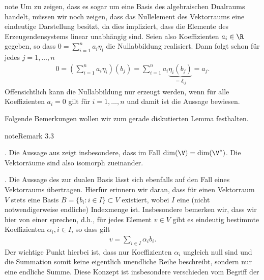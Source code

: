 \documentclass[letterpaper,10pt,english]{jupyterBook}
\begin{document}
\begin{sphinxadmonition}{note}
\sphinxAtStartPar
Um zu zeigen, dass es sogar um eine Basis des algebraischen Dualraums handelt, müssen wir noch zeigen, dass das Nullelement des Vektorraums eine eindeutige Darstellung besitzt, da dies impliziert, dass die Elemente des Erzeugendensystems linear unabhängig sind.
Seien also Koeffizienten \(a_i\in\R\) gegeben, so dass \(0 = \sum_{i=1}^n a_i \eta_i\) die Nullabbildung realisiert.
Dann folgt schon für jedes \(j=1,\ldots,n\)
\begin{equation*}
\begin{split}0 = \left(\sum_{i=1}^n a_i \eta_i\right)(b_j) = \sum_{i=1}^n a_i \underbrace{\eta_i(b_j)}_{=\delta_{ij}} = a_j.\end{split}
\end{equation*}
\sphinxAtStartPar
Offensichtlich kann die Nullabbildung nur erzeugt werden, wenn für alle Koeffizienten \(a_i=0\) gilt für \(i=1,\ldots,n\) und damit ist die Aussage bewiesen.
\end{sphinxadmonition}

\sphinxAtStartPar
Folgende Bemerkungen wollen wir zum gerade diskutierten Lemma festhalten.
\label{vektoranalysis/multilinear:remark-11}
\begin{sphinxadmonition}{note}{Remark 3.3}



. Die Aussage aus {\hyperref[\detokenize{vektoranalysis/multilinear:lem:dualeBasis}]{}} zeigt insbesondere, dass im  Fall \(\dim(\V) = \dim(\V^\ast)\).
Die Vektorräume sind also isomorph zueinander.

. Die Aussage des {\hyperref[\detokenize{vektoranalysis/multilinear:lem:dualeBasis}]{}} zur dualen Basis lässt sich ebenfalls auf den Fall eines  Vektorraums übertragen.
Hierfür erinnern wir daran, dass für einen Vektorraum \(V\) stets eine Basis \(B = \{b_i:i\in I\}\subset V\) existiert, wobei \(I\) eine (nicht notwendigerweise endliche) Indexmenge ist.
Insbesondere bemerken wir, dass wir hier von einer  sprechen, d.h., für jedes Element \(v\in V\) gibt es eindeutig bestimmte Koeffizienten \(\alpha_i, i\in I\), so dass gilt
\begin{equation*}
\begin{split}v = \sum_{i\in I} \alpha_i b_i.\end{split}
\end{equation*}
\sphinxAtStartPar
Der wichtige Punkt hierbei ist, dass nur  Koeffizienten \(\alpha_i\) ungleich null sind und die Summation somit keine eigentlich unendliche Reihe beschreibt, sondern nur eine endliche Summe.
Diese Konzept ist insbesondere verschieden vom Begriff der 
\end{sphinxadmonition}
\end{document}
